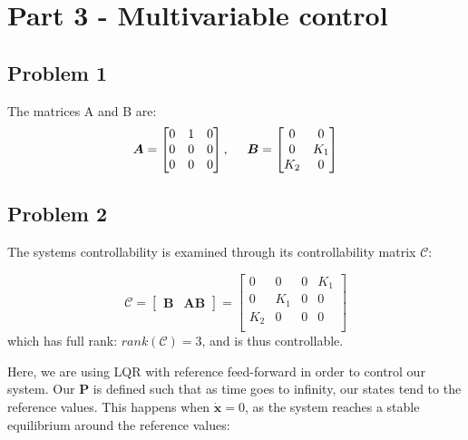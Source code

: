 \section{Part 3 - Multivariable control}
\subsection{Problem 1}
The matrices A and B are:
\begin{equation}
  \boldsymbol{A} = \begin{bmatrix}
    0 & 1 & 0 \\
    0 & 0 & 0 \\
    0 & 0 & 0 \\
  \end{bmatrix}, \hspace{0.5cm}
  \boldsymbol{B} = \begin{bmatrix}
    0 & 0 \\
    0 & K_1 \\
    K_2 & 0 \\
  \end{bmatrix}
\end{equation}

\subsection{Problem 2}
The systems controllability is examined through its controllability
matrix $\boldsymbol{\mathcal{C}}$:

\begin{equation}
  \boldsymbol{\mathcal{C}} = \begin{bmatrix}
    \boldsymbol{B} & \boldsymbol{AB}
  \end{bmatrix}
  =
  \begin{bmatrix}
    0 & 0 & 0 & K_1 \\
    0 & K_1 & 0 & 0 \\
    K_2 & 0 & 0 & 0 \\
  \end{bmatrix}
\end{equation}
which has full rank: $rank(\boldsymbol{\mathcal{C}}) = 3$, and is thus
controllable.

Here, we are using LQR with reference feed-forward in order to control
our system. Our $\boldsymbol{P}$ is defined such that as time goes to
infinity, our states tend to the reference values. This happens when
$\dot{\boldsymbol{x}} = 0$, as the system reaches a stable equilibrium
around the reference values:

